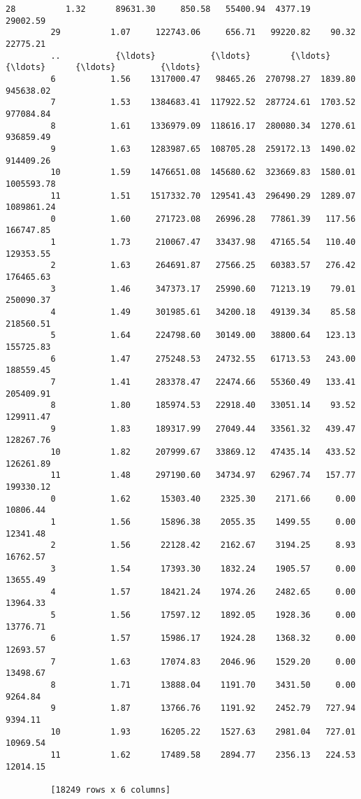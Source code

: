\documentclass[11pt]{article}
\begin{document}
\begin{Verbatim}[commandchars=\\\{\}]
         28          1.32      89631.30     850.58   55400.94  4377.19    29002.59
         29          1.07     122743.06     656.71   99220.82    90.32    22775.21
         ..           {\ldots}           {\ldots}        {\ldots}        {\ldots}      {\ldots}         {\ldots}
         6           1.56    1317000.47   98465.26  270798.27  1839.80   945638.02
         7           1.53    1384683.41  117922.52  287724.61  1703.52   977084.84
         8           1.61    1336979.09  118616.17  280080.34  1270.61   936859.49
         9           1.63    1283987.65  108705.28  259172.13  1490.02   914409.26
         10          1.59    1476651.08  145680.62  323669.83  1580.01  1005593.78
         11          1.51    1517332.70  129541.43  296490.29  1289.07  1089861.24
         0           1.60     271723.08   26996.28   77861.39   117.56   166747.85
         1           1.73     210067.47   33437.98   47165.54   110.40   129353.55
         2           1.63     264691.87   27566.25   60383.57   276.42   176465.63
         3           1.46     347373.17   25990.60   71213.19    79.01   250090.37
         4           1.49     301985.61   34200.18   49139.34    85.58   218560.51
         5           1.64     224798.60   30149.00   38800.64   123.13   155725.83
         6           1.47     275248.53   24732.55   61713.53   243.00   188559.45
         7           1.41     283378.47   22474.66   55360.49   133.41   205409.91
         8           1.80     185974.53   22918.40   33051.14    93.52   129911.47
         9           1.83     189317.99   27049.44   33561.32   439.47   128267.76
         10          1.82     207999.67   33869.12   47435.14   433.52   126261.89
         11          1.48     297190.60   34734.97   62967.74   157.77   199330.12
         0           1.62      15303.40    2325.30    2171.66     0.00    10806.44
         1           1.56      15896.38    2055.35    1499.55     0.00    12341.48
         2           1.56      22128.42    2162.67    3194.25     8.93    16762.57
         3           1.54      17393.30    1832.24    1905.57     0.00    13655.49
         4           1.57      18421.24    1974.26    2482.65     0.00    13964.33
         5           1.56      17597.12    1892.05    1928.36     0.00    13776.71
         6           1.57      15986.17    1924.28    1368.32     0.00    12693.57
         7           1.63      17074.83    2046.96    1529.20     0.00    13498.67
         8           1.71      13888.04    1191.70    3431.50     0.00     9264.84
         9           1.87      13766.76    1191.92    2452.79   727.94     9394.11
         10          1.93      16205.22    1527.63    2981.04   727.01    10969.54
         11          1.62      17489.58    2894.77    2356.13   224.53    12014.15
         
         [18249 rows x 6 columns]
\end{Verbatim}
            
\end{document}
